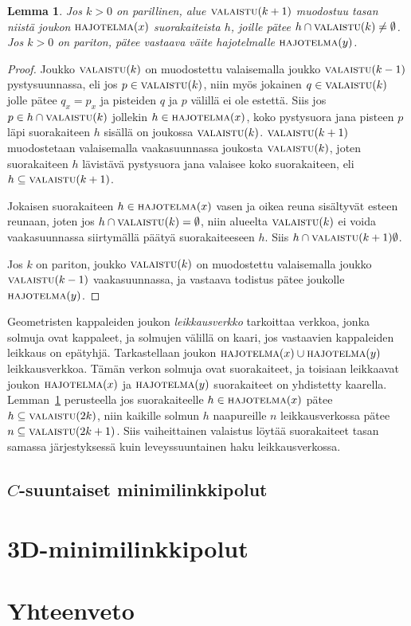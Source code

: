 \documentclass[finnish]{tktltiki2}
\newtheorem{lem}[lau]{Lemma}
\theoremstyle{definition}
\theoremstyle{remark}
\newcommand\reach[1]{\ensuremath{\textsc{valaistu}(#1)}\xspace}
\newcommand\decomp[1]{\ensuremath{\textsc{hajotelma}(#1)}\xspace}
\begin{document}
\begin{lem}\label{lem:valaisu}
Jos $k>0$ on parillinen, alue \reach{k+1} muodostuu tasan niistä joukon \decomp{x} suorakaiteista $h$, joille pätee $h\cap\reach{k}\neq\emptyset$.
Jos $k>0$ on pariton, pätee vastaava väite hajotelmalle \decomp{y}.
\end{lem}
\begin{proof}
Joukko \reach{k} on muodostettu valaisemalla joukko \reach{k-1} pystysuunnassa, eli jos $p\in\reach{k}$, niin myös jokainen $q\in\reach{k}$ jolle pätee $q_x=p_x$ ja pisteiden $q$ ja $p$ välillä ei ole estettä.
Siis jos $p\in h\cap\reach{k}$ jollekin $h\in\decomp{x}$, koko pystysuora jana pisteen $p$ läpi suorakaiteen $h$ sisällä on joukossa \reach{k}.
\reach{k+1} muodostetaan valaisemalla vaakasuunnassa joukosta \reach{k}, joten suorakaiteen $h$ lävistävä pystysuora jana valaisee koko suorakaiteen, eli $h\subseteq\reach{k+1}$.

Jokaisen suorakaiteen $h\in\decomp{x}$ vasen ja oikea reuna sisältyvät esteen reunaan, joten jos $h\cap\reach{k}=\emptyset$, niin alueelta \reach{k} ei voida vaakasuunnassa siirtymällä päätyä suorakaiteeseen $h$.
Siis $h\cap\reach{k+1}\emptyset$.

Jos $k$ on pariton, joukko \reach{k} on muodostettu valaisemalla joukko \reach{k-1} vaakasuunnassa, ja vastaava todistus pätee joukolle \decomp{y}.
\end{proof}

Geometristen kappaleiden joukon \emph{leikkausverkko} tarkoittaa verkkoa, jonka solmuja ovat kappaleet, ja solmujen välillä on kaari, jos vastaavien kappaleiden leikkaus on epätyhjä.
Tarkastellaan joukon $\decomp{x}\cup\decomp{y}$ leikkausverkkoa.
Tämän verkon solmuja ovat suorakaiteet, ja toisiaan leikkaavat joukon \decomp{x} ja \decomp{y} suorakaiteet on yhdistetty kaarella.
Lemman~\ref{lem:valaisu} perusteella jos suorakaiteelle $h\in\decomp{x}$ pätee $h\subseteq\reach{2k}$, niin kaikille solmun $h$ naapureille $n$ leikkausverkossa pätee $n\subseteq\reach{2k+1}$.
Siis vaiheittainen valaistus löytää suorakaiteet tasan samassa järjestyksessä kuin leveyssuuntainen haku leikkausverkossa.

\subsection{$C$-suuntaiset minimilinkkipolut}\label{subsec:c2d}



\section{3D-minimilinkkipolut}\label{sec:link3d}



\section{Yhteenveto}





\end{document}
